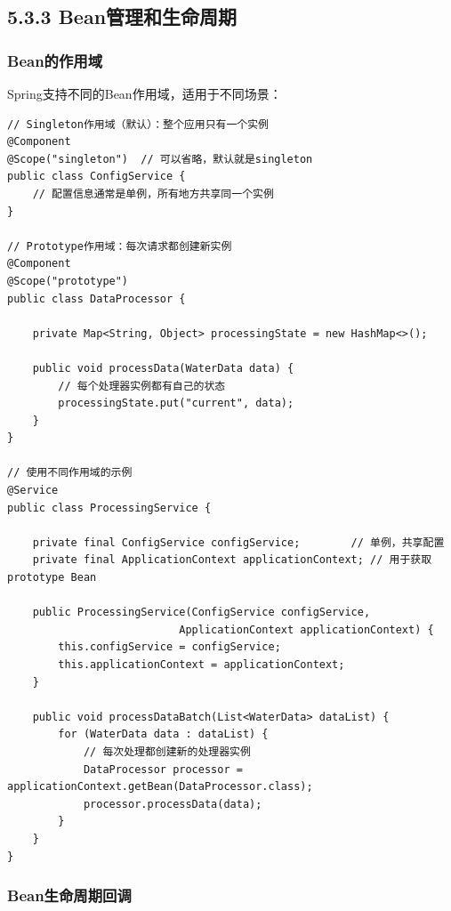 \hypertarget{beanux7ba1ux7406ux548cux751fux547dux5468ux671f}{%
\subsection{5.3.3 Bean管理和生命周期}\label{beanux7ba1ux7406ux548cux751fux547dux5468ux671f}}

\hypertarget{beanux7684ux4f5cux7528ux57df}{%
\subsubsection{Bean的作用域}\label{beanux7684ux4f5cux7528ux57df}}

Spring支持不同的Bean作用域，适用于不同场景：

\begin{lstlisting}[style=java]
// Singleton作用域（默认）：整个应用只有一个实例
@Component
@Scope("singleton")  // 可以省略，默认就是singleton
public class ConfigService {
    // 配置信息通常是单例，所有地方共享同一个实例
}

// Prototype作用域：每次请求都创建新实例
@Component
@Scope("prototype")
public class DataProcessor {
    
    private Map<String, Object> processingState = new HashMap<>();
    
    public void processData(WaterData data) {
        // 每个处理器实例都有自己的状态
        processingState.put("current", data);
    }
}

// 使用不同作用域的示例
@Service
public class ProcessingService {
    
    private final ConfigService configService;        // 单例，共享配置
    private final ApplicationContext applicationContext; // 用于获取prototype Bean
    
    public ProcessingService(ConfigService configService, 
                           ApplicationContext applicationContext) {
        this.configService = configService;
        this.applicationContext = applicationContext;
    }
    
    public void processDataBatch(List<WaterData> dataList) {
        for (WaterData data : dataList) {
            // 每次处理都创建新的处理器实例
            DataProcessor processor = applicationContext.getBean(DataProcessor.class);
            processor.processData(data);
        }
    }
}
\end{lstlisting}

\hypertarget{beanux751fux547dux5468ux671fux56deux8c03}{%
\subsubsection{Bean生命周期回调}\label{beanux751fux547dux5468ux671fux56deux8c03}}

